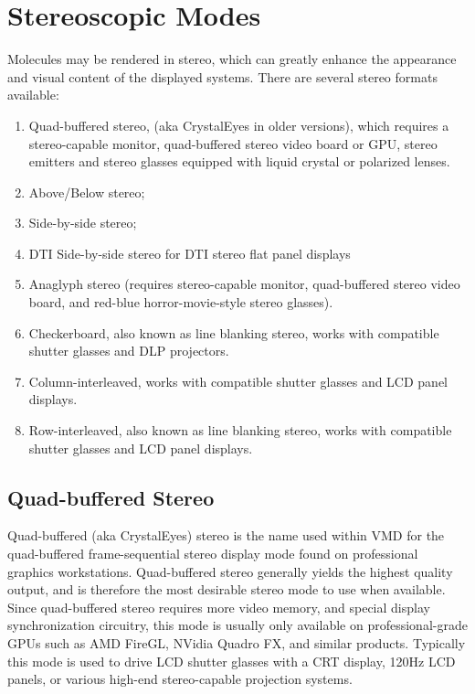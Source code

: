 \section{Stereoscopic Modes}
Molecules may be rendered in stereo, which can greatly enhance
the appearance and visual content of the displayed systems.  There are
several stereo formats available:
\begin{enumerate}
  \item Quad-buffered stereo, (aka CrystalEyes in older versions), 
        which requires a stereo-capable monitor, 
        quad-buffered stereo video board or GPU, 
        stereo emitters and stereo glasses equipped with 
        liquid crystal or polarized lenses.
  \item Above/Below stereo;
  \item Side-by-side stereo;
  \item DTI Side-by-side stereo for DTI stereo flat panel displays
  \item Anaglyph stereo (requires stereo-capable monitor, 
        quad-buffered stereo video board, 
        and red-blue horror-movie-style stereo glasses).
  \item Checkerboard, also known as line blanking stereo,
        works with compatible shutter glasses and DLP projectors.
  \item Column-interleaved,
        works with compatible shutter glasses and LCD panel displays.
  \item Row-interleaved, also known as line blanking stereo,
        works with compatible shutter glasses and LCD panel displays.
\end{enumerate}

\subsection{Quad-buffered Stereo}
Quad-buffered (aka CrystalEyes) stereo is the name used within VMD for the 
quad-buffered frame-sequential stereo display mode found on 
professional graphics workstations.  Quad-buffered stereo generally yields
the highest quality output, and is therefore the most desirable stereo
mode to use when available.  Since quad-buffered stereo requires more 
video memory, and special display synchronization circuitry, this mode
is usually only available on professional-grade GPUs such as 
AMD FireGL, NVidia Quadro FX, and similar products.
Typically this 
mode is used to drive LCD shutter glasses with a CRT display,
120Hz LCD panels, or various high-end stereo-capable projection systems.


